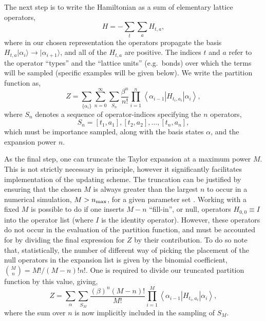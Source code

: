 \documentclass[vecphys]{svmult}
\begin{document}
The next step is to write the Hamiltonian as a sum of elementary lattice operators,
\begin{equation}
H=-\sum_t \sum_a H_{t,a}, \label{Melko:Hdecomp}
\end{equation}
where in our chosen representation the operators propagate the basis $H_{t,a} |\alpha_i \rangle \rightarrow | \alpha_{i+1} \rangle$, and all of the $H_{t,a}$ are positive.  The indices $t$ and $a$ refer to the operator ``types'' and the ``lattice units'' (e.g.~bonds) over which the terms will be sampled (specific examples will be given below).  We write the partition function as, 
\begin{equation}
Z=\sum_{ \{ \alpha_i \} } \sum_{n=0}^{\infty} \sum_{S_n} \frac{ \beta^n}{n !}
 \prod_{i=1}^{n}  \left\langle{\alpha_{i-1}  \left|  {H_{t_i,a_i}}  \right| \alpha_i   }\right\rangle,
 \label{Melko:Zsse2b}
\end{equation}
where $S_n$ denotes a sequence of operator-indices specifying the $n$ operators,
\begin{equation}
S_n = [t_1,a_1],[t_2,a_2], \ldots ,[t_n,a_n],
\end{equation}
which must be importance sampled, along with the basis states $\alpha$, and the expansion power $n$.   

As the final step, one can truncate the Taylor expansion at a maximum power $M$.  This is not strictly necessary in principle, however it significantly facilitates implementation of the updating scheme.  The truncation can be justified 
by ensuring that the chosen $M$ is always greater than the largest $n$ to occur in a numerical simulation, $M>n_{\rm max}$, for a given parameter set \cite{Melko:SandvikHeis}.  
Working with a fixed $M$ is possible to do if one inserts $M-n$ ``fill-in'', or null, operators $H_{0,0} \equiv I$ into the operator list (where $I$ is the identity operator).  However, these operators do not occur in the evaluation of the partition function, and must be accounted for by dividing the final expression for $Z$ by their contribution.  To do so note that, statistically, the number of different way of picking the placement of the null operators in the expansion list is given by the binomial coefficient,
${M \choose n}= M!/(M-n)!n!$.  One is required to divide our truncated partition function by this value, giving,
\begin{equation}Z=\sum_{\alpha} \sum_{S_M} \frac{ (\beta)^n (M-n)!}{M !}  %
 \prod_{i=1}^{M}  \left\langle{\alpha_{i-1}  \left|  {H_{t_i,a_i}}  \right| \alpha_i   }\right\rangle,
 \label{Melko:Zsse3}
\end{equation}
where the sum over $n$ is now implicitly included in the sampling of $S_M$.
\end{document}
